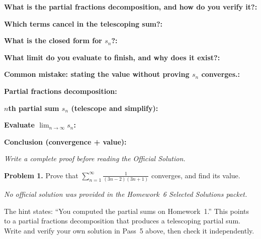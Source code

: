 \documentclass[12pt]{article}
\newcommand{\fillfield}[1]{%
  \par\noindent\textbf{#1:}\enspace\hrulefill\par\vspace{3pt}%
}
\newcommand{\writespace}[1]{\vspace{#1}}
\begin{document}
\bigskip

\begin{tcolorbox}[
  enhanced, breakable,
  colback  = pass3orange,
  colframe = orange!65!black,
  fonttitle = \bfseries,
  title = {Pass 3 \enspace\textbf{--}\enspace Self-Explanation}
]
\fillfield{What is the partial fractions decomposition, and how do you verify it?}
\fillfield{Which terms cancel in the telescoping sum?}
\fillfield{What is the closed form for $s_n$?}
\fillfield{What limit do you evaluate to finish, and why does it exist?}
\fillfield{Common mistake: stating the value without proving $s_n$ converges.}
\end{tcolorbox}

\newpage

\begin{tcolorbox}[
  enhanced, breakable,
  colback  = pass4purple,
  colframe = purple!55!black,
  fonttitle = \bfseries,
  title = {Pass 4 \enspace\textbf{--}\enspace Skeleton Proof}
]
\noindent\textbf{Partial fractions decomposition:}\par
\writespace{1.8cm}

\noindent\textbf{$n$th partial sum $s_n$ (telescope and simplify):}\par
\writespace{2.4cm}

\noindent\textbf{Evaluate $\lim_{n\to\infty} s_n$:}\par
\writespace{1.8cm}

\noindent\textbf{Conclusion (convergence + value):}\par
\writespace{1.0cm}
\end{tcolorbox}

\newpage

\begin{tcolorbox}[
  enhanced, breakable,
  colback  = pass5gray,
  colframe = black!38,
  fonttitle = \bfseries,
  title = {Pass 5 \enspace\textbf{--}\enspace Full Proof Attempt}
]
\small\itshape Write a complete proof before reading the Official Solution.\par
\normalfont\normalsize
\writespace{19cm}
\end{tcolorbox}

\newpage

\begin{tcolorbox}[
  enhanced, breakable,
  colback  = solgreen,
  colframe = green!45!black,
  fonttitle = \bfseries,
  title = {\textsc{Official Solution}\hfill Homework 6 -- Selected Solutions}
]
\textbf{Problem 1.}
Prove that $\displaystyle\sum_{n=1}^{\infty} \frac{1}{(3n-2)(3n+1)}$ converges,
and find its value.

\medskip
\textit{No official solution was provided in the Homework~6 Selected Solutions packet.}

\medskip
The hint states: ``You computed the partial sums on Homework~1.''
This points to a partial fractions decomposition that produces a telescoping partial sum.
Write and verify your own solution in Pass~5 above, then check it independently.
\end{tcolorbox}
\end{document}
